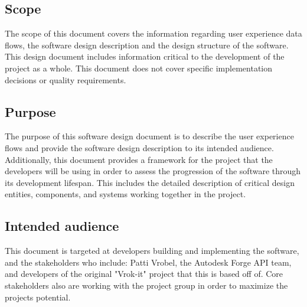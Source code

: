 \documentclass[letterpaper, 10pt, draftclsnofoot, compsoc, onecolumn]{IEEEtran}
\begin{document}
\subsection{Scope}
The scope of this document covers the information regarding user experience data flows, the software design description and the design structure of the software. This design document includes information critical to the development of the project as a whole. This document does not cover specific implementation decisions or quality requirements.
\subsection{Purpose}
The purpose of this software design document is to describe the user experience flows and provide the software design description to its intended audience. Additionally, this document provides a framework for the project that the developers will be using in order to assess the progression of the software through its development lifespan. This includes the detailed description of critical design entities, components, and systems working together in the project.
\subsection{Intended audience}
This document is targeted at developers building and implementing the software, and the stakeholders who include: Patti Vrobel, the Autodesk Forge API team,  and developers of the original "Vrok-it" project that this is based off of. Core stakeholders also are working with the project group in order to maximize the projects potential.
\end{document}
